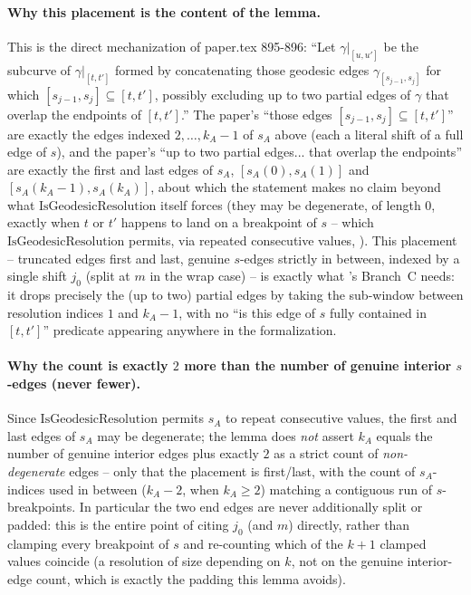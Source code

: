 \begin{lemma}
  \paragraph{Why this placement is the content of the lemma.} This is the direct mechanization of
  paper.tex 895-896: ``Let $\gamma|_{[u,u']}$ be the subcurve of $\gamma|_{[t,t']}$ formed by
  concatenating those geodesic edges $\gamma_{[s_{j-1},s_j]}$ for which $[s_{j-1},s_j] \subseteq
  [t,t']$, possibly excluding up to two partial edges of $\gamma$ that overlap the endpoints of
  $[t,t']$.'' The paper's ``those edges $[s_{j-1},s_j] \subseteq [t,t']$'' are exactly the edges
  indexed $2,\dots,k_A-1$ of $s_A$ above (each a literal shift of a full edge of $s$), and the
  paper's ``up to two partial edges... that overlap the endpoints'' are exactly the first and last
  edges of $s_A$, $[s_A(0),s_A(1)]$ and $[s_A(k_A-1),s_A(k_A)]$, about which the statement makes no
  claim beyond what $\mathrm{IsGeodesicResolution}$ itself forces (they may be degenerate, of
  length $0$, exactly when $t$ or $t'$ happens to land on a breakpoint of $s$ -- which
  $\mathrm{IsGeodesicResolution}$ permits, via repeated consecutive values,
  ). This placement -- truncated edges first and last, genuine
  $s$-edges strictly in between, indexed by a single shift $j_0$ (split at $m$ in the wrap case) --
  is exactly what 's Branch~C needs: it drops precisely the (up to two) partial
  edges by taking the sub-window between resolution indices $1$ and $k_A-1$, with no ``is this edge
  of $s$ fully contained in $[t,t']$'' predicate appearing anywhere in the formalization.

  \paragraph{Why the count is exactly $2$ more than the number of genuine interior $s$-edges (never
  fewer).} Since $\mathrm{IsGeodesicResolution}$ permits $s_A$ to repeat consecutive values, the
  first and last edges of $s_A$ may be degenerate; the lemma does \emph{not} assert $k_A$ equals the
  number of genuine interior edges plus exactly $2$ as a strict count of \emph{non-degenerate}
  edges -- only that the placement is first/last, with the count of $s_A$-indices used in between
  ($k_A-2$, when $k_A \ge 2$) matching a contiguous run of $s$-breakpoints. In particular the two end
  edges are never additionally split or padded: this is the entire point of citing $j_0$ (and $m$)
  directly, rather than clamping every breakpoint of $s$ and re-counting which of the $k+1$ clamped
  values coincide (a resolution of size depending on $k$, not on the genuine interior-edge count,
  which is exactly the padding this lemma avoids).
\end{lemma}
